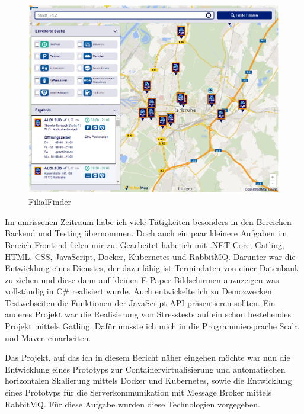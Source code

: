 \documentclass[12pt,a4paper]{scrartcl}
\begin{document}
\begin{figure}[h!]
	\centering
	\includegraphics[scale=0.55]{YmFF.png}
	\caption[https://www.aldi-sued.de/filialen/]{FilialFinder}
\end{figure}

Im umrissenen Zeitraum habe ich viele Tätigkeiten besonders in den Bereichen Backend und Testing übernommen. Doch auch ein paar kleinere Aufgaben im Bereich Frontend fielen mir zu. Gearbeitet habe ich mit .NET Core, Gatling, HTML, CSS, JavaScript, Docker, Kubernetes und RabbitMQ. 
Darunter war die Entwicklung eines Dienstes, der dazu fähig ist Termindaten von einer Datenbank zu ziehen und diese dann auf kleinen E-Paper-Bildschirmen anzuzeigen was vollständig in C\# realisiert wurde. Auch entwickelte ich zu Demozwecken Testwebseiten die Funktionen der JavaScript API präsentieren sollten. Ein anderes Projekt war die Realisierung von Stresstests auf ein schon bestehendes Projekt mittels Gatling. Dafür musste ich mich in die Programmiersprache Scala und Maven einarbeiten. 

Das Projekt, auf das ich in diesem Bericht näher eingehen möchte war nun die Entwicklung eines Prototyps zur Containervirtualisierung und automatischen horizontalen Skalierung mittels Docker und Kubernetes, sowie die Entwicklung eines Prototyps für die Serverkommunikation mit Message Broker mittels RabbitMQ. Für diese Aufgabe wurden diese Technologien vorgegeben. 
\end{document}
